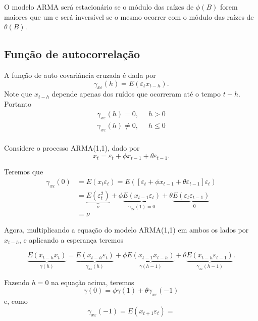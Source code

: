 \documentclass[
  letterpaper,
  DIV=11,
  numbers=noendperiod]{scrartcl}
\theoremstyle{plain}
\theoremstyle{plain}
\theoremstyle{definition}
\theoremstyle{definition}
\theoremstyle{remark}
\begin{document}
O modelo ARMA será estacionário se o módulo das raízes de \(\phi(B)\)
forem maiores que um e será inversível se o mesmo ocorrer com o módulo
das raízes de \(\theta(B)\).

\hypertarget{funuxe7uxe3o-de-autocorrelauxe7uxe3o}{%
\subsection{Função de
autocorrelação}\label{funuxe7uxe3o-de-autocorrelauxe7uxe3o}}

A função de auto covariância cruzada é dada por \[\begin{equation}
      \gamma_{x\varepsilon}(h)=E(\varepsilon_t x_{t-h}).
    \end{equation}\] Note que \(x_{t-h}\) depende apenas dos ruídos que
ocorreram até o tempo \(t-h\). Portanto \[\begin{align}
     \gamma_{x\varepsilon}(h)=0,&\;\; h>0 \\
     \gamma_{x\varepsilon}(h)\neq 0,&\;\; h\leq 0 \\
    \end{align}\]

Considere o processo ARMA(1,1), dado por
\[x_t = \varepsilon_{t} + \phi x_{t-1} + \theta\varepsilon_{t-1}.\]

Teremos que \[\begin{align*}
\gamma_{x\varepsilon}(0)&=E(x_t\varepsilon_t) = E( \left[\varepsilon_t + \phi x_{t-1} + \theta\varepsilon_{t-1} \right]\varepsilon_t)\\
&=\underbrace{E(\varepsilon_t^2)}_{\nu}+ \phi\underbrace{ E(x_{t-1}\varepsilon_t)}_{\gamma_{x\varepsilon}(1)=0} +\theta \underbrace{E(\varepsilon_{t}\varepsilon_{t-1})}_{=0} \\
&=\nu
\end{align*}\]

Agora, multiplicando a equação do modelo ARMA(1,1) em ambos os lados por
\(x_{t-h}\), e aplicando a esperança teremos

\[\begin{equation}
    \underbrace{E(x_{t-h}x_t)}_{\gamma(h)} = \underbrace{E(x_{t-h}\varepsilon_{t})}_{\gamma_{x\varepsilon}(h)} + \phi \underbrace{E(x_{t-1}x_{t-h})}_{\gamma(h-1)} + \theta \underbrace{E(x_{t-h}\varepsilon_{t-1})}_{\gamma_{x\varepsilon}(h-1)}.
    \end{equation}\]

Fazendo \(h=0\) na equação acima, teremos
\[\gamma(0)=\phi\gamma(1) + \theta\gamma_{x\varepsilon}(-1)\] e, como
\[\gamma_{x\varepsilon}(-1)=E(x_{t+1}\varepsilon_t)=\]
\end{document}
